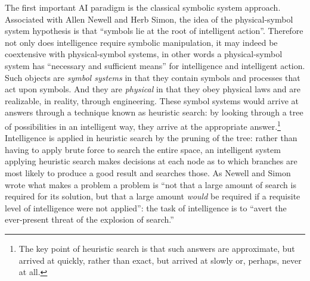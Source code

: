 The first important AI paradigm is the classical symbolic system
approach. Associated with Allen Newell and Herb Simon, the idea of the
physical-symbol system hypothesis is that ``symbols lie at the root of
intelligent action''\cite[p. 109]{newellsimon}. Therefore not only
does intelligence require symbolic manipulation, it may indeed be
coextensive with physical-symbol systems, in other words a
physical-symbol system has ``necessary and sufficient means'' for
intelligence and intelligent action.\cite[p. 111]{newellsimon} Such
objects are \emph{symbol systems} in that they contain symbols and processes
that act upon symbols. And they are \emph{physical} in that they obey
physical laws and are realizable, in reality, through engineering.
These symbol systems would arrive at answers through a technique known as
heuristic search: by looking through a tree of possibilities in an
intelligent way, they arrive at the appropriate answer.\footnote{The key
  point of heuristic search is that such answers are approximate, but
  arrived at quickly, rather than exact, but arrived at slowly or,
  perhaps, never at all.} Intelligence is applied in heuristic search
by the pruning of the tree: rather than having to apply brute force to
search the entire space, an intelligent system applying heuristic
search makes decisions at each node as to which branches are most
likely to produce a good result and searches those.\cite[p.
  124]{newellsimon} As Newell and Simon wrote what makes a problem a
problem is ``not that a large amount of search is required for its
solution, but that a large amount \emph{would} be required if a requisite
level of intelligence were not applied'': the task of intelligence is
to ``avert the ever-present threat of the explosion of
search.''\cite[p. 125]{newellsimon} 

